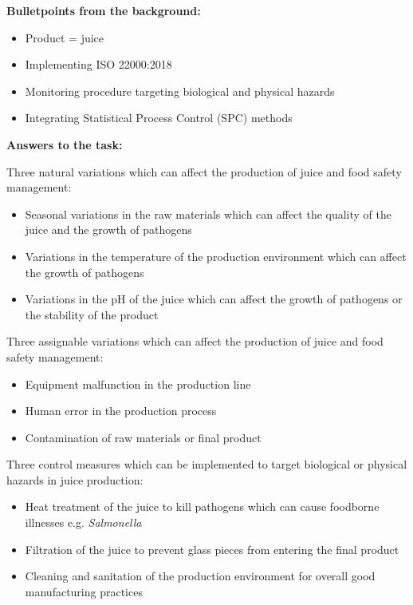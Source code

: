 \textbf{Bulletpoints from the background:}
\begin{itemize}
    \item Product = juice
    \item Implementing ISO 22000:2018
    \item Monitoring procedure targeting biological and physical hazards
    \item Integrating Statistical Process Control (SPC) methods
\end{itemize}

\vspace{2\baselineskip}

\textbf{Answers to the task:}
\vspace{1\baselineskip}

Three natural variations which can affect the production of juice and food safety management:
\begin{itemize}
    \item Seasonal variations in the raw materials which can affect the quality of the juice and the growth of pathogens
    \item Variations in the temperature of the production environment which can affect the growth of pathogens
    \item Variations in the pH of the juice which can affect the growth of pathogens or the stability of the product
\end{itemize}

\vspace{1\baselineskip}

Three assignable variations which can affect the production of juice and food safety management:
\begin{itemize}
    \item Equipment malfunction in the production line
    \item Human error in the production process
    \item Contamination of raw materials or final product
\end{itemize}

\vspace{1\baselineskip}

Three control measures which can be implemented to target biological or physical hazards in juice production:
\begin{itemize}
    \item Heat treatment of the juice to kill pathogens which can cause foodborne illnesses e.g. \textit{Salmonella}
    \item Filtration of the juice to prevent glass pieces from entering the final product
    \item Cleaning and sanitation of the production environment for overall good manufacturing practices
\end{itemize}

